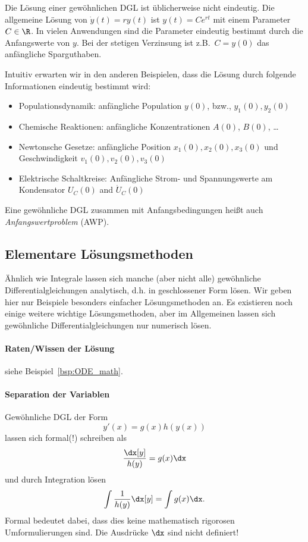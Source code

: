 \documentclass[
]{mycourse}
\theoremstyle{mythm}
\theoremstyle{break}
\begin{document}
Die Lösung einer gewöhnlichen DGL ist üblicherweise nicht eindeutig. Die allgemeine Lösung von $\dot y(t)=ry(t)$ 
ist $y(t)=Ce^{rt}$ mit einem Parameter $C\in \R$. In vielen Anwendungen sind die Parameter eindeutig
bestimmt durch die Anfangswerte von $y$. Bei der stetigen Verzinsung ist z.B.\ $C=y(0)$ das anfängliche
Sparguthaben.

Intuitiv erwarten wir in den anderen Beispielen, dass die Lösung durch folgende Informationen eindeutig bestimmt wird:
\begin{itemize}
\item Populationsdynamik: anfängliche Population $y(0)$, bzw., $y_1(0),y_2(0)$
\item Chemische Reaktionen: anfängliche Konzentrationen $A(0)$, $B(0)$, \ldots
\item Newtonsche Gesetze: anfängliche Position $x_1(0),x_2(0),x_3(0)$ und Geschwindigkeit $v_1(0),v_2(0),v_3(0)$
\item Elektrische Schaltkreise: Anfängliche Strom- und Spannungswerte am Kondensator $U_C(0)$ and $\dot U_C(0)$
\end{itemize}

Eine gewöhnliche DGL zusammen mit Anfangsbedingungen heißt auch \emph{Anfangswertproblem} (AWP).

\subsection{Elementare Lösungsmethoden}

Ähnlich wie Integrale lassen sich manche (aber nicht alle) gewöhnliche
Differentialgleichungen analytisch, d.h. in geschlossener Form lösen. Wir geben hier nur Beispiele 
besonders einfacher Lösungsmethoden an. Es existieren noch einige weitere wichtige Lösungsmethoden,
aber im Allgemeinen lassen sich gewöhnliche Differentialgleichungen nur numerisch lösen.



\paragraph{Raten/Wissen der Lösung}

siehe Beispiel~\ref{bsp:ODE_math}.

\paragraph{Separation der Variablen}

Gewöhnliche DGL der Form 
\[
y'(x)=g(x) h(y(x))
\]
lassen sich formal(!) schreiben als
\begin{align}
\frac{\dx[y]}{h(y)}=g(x)\dx
\end{align}
und durch Integration lösen
\begin{align}
\int \frac{1}{h(y)} \dx[y]=\int g(x)\dx.
\end{align}
Formal bedeutet dabei, dass dies keine mathematisch rigorosen Umformulierungen sind.
Die Ausdrücke $\dx$ sind nicht definiert! 
\end{document}
